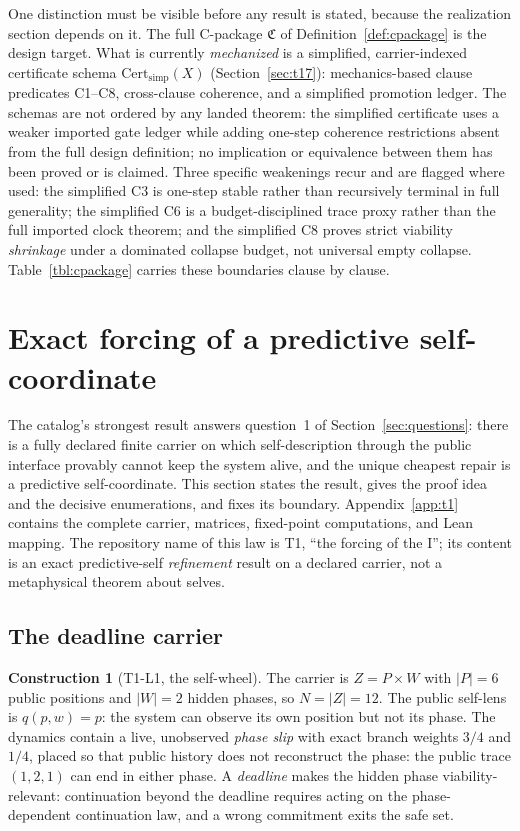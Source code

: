 \documentclass[11pt]{article}
\newcommand{\Cpkg}{\mathfrak{C}}
\newcommand{\Certsimp}{\mathrm{Cert}_{\mathrm{simp}}}
\theoremstyle{definition}
\newtheorem{construction}[theorem]{Construction}
\begin{document}
One distinction must be visible before any result is stated, because the
realization section depends on it. The full C-package $\Cpkg$ of
Definition~\ref{def:cpackage} is the design target. What is currently
\emph{mechanized} is a simplified, carrier-indexed certificate schema
$\Certsimp(X)$ (Section~\ref{sec:t17}): mechanics-based clause predicates
C1--C8, cross-clause coherence, and a simplified promotion ledger. The schemas
are not ordered by any landed theorem: the simplified certificate uses a
weaker imported gate ledger while adding one-step coherence restrictions
absent from the full design definition; no implication or equivalence between
them has been proved or is claimed. Three specific weakenings recur and are
flagged where used: the simplified C3 is one-step stable rather than
recursively terminal in full generality; the simplified C6 is a
budget-disciplined trace proxy rather than the full imported clock theorem;
and the simplified C8 proves strict viability \emph{shrinkage} under a
dominated collapse budget, not universal empty collapse. Table~\ref{tbl:cpackage}
carries these boundaries clause by clause.

 \section{Exact forcing of a predictive self-coordinate}
\label{sec:t1}


The catalog's strongest result answers question~1 of
Section~\ref{sec:questions}: there is a fully declared finite carrier on which
self-description through the public interface provably cannot keep the system
alive, and the unique cheapest repair is a predictive self-coordinate. This
section states the result, gives the proof idea and the decisive enumerations,
and fixes its boundary. Appendix~\ref{app:t1} contains the complete carrier,
matrices, fixed-point computations, and Lean mapping. The repository name of
this law is T1, ``the forcing of the I''; its content is an exact
predictive-self \emph{refinement} result on a declared carrier, not a
metaphysical theorem about selves.

\subsection{The deadline carrier}
\label{sec:t1carrier}

\begin{construction}[T1-L1, the self-wheel]
\label{con:t1}
The carrier is $Z = P \times W$ with $|P|=6$ public positions and $|W|=2$
hidden phases, so $N = |Z| = 12$. The public self-lens is $q(p,w)=p$: the
system can observe its own position but not its phase. The dynamics contain a
live, unobserved \emph{phase slip} with exact branch weights $3/4$ and $1/4$,
placed so that public history does not reconstruct the phase: the public trace
$(1,2,1)$ can end in either phase. A \emph{deadline} makes the hidden phase
viability-relevant: continuation beyond the deadline requires acting on the
phase-dependent continuation law, and a wrong commitment exits the safe set.
\end{construction}
\end{document}
